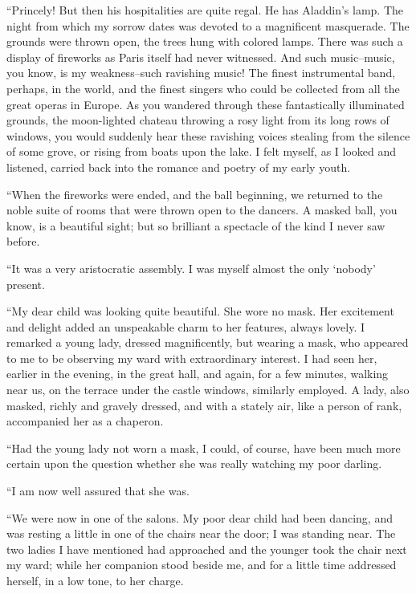\documentclass[11pt,twoside,makeidx,hidelinks,]{memoir}
\begin{document}
``Princely! But then his hospitalities are quite regal. He has Aladdin's
lamp. The night from which my sorrow dates was devoted to a magnificent
masquerade. The grounds were thrown open, the trees hung with colored
lamps. There was such a display of fireworks as Paris itself had never
witnessed. And such music--music, you know, is my weakness--such
ravishing music! The finest instrumental band, perhaps, in the world,
and the finest singers who could be collected from all the great operas
in Europe. As you wandered through these fantastically illuminated
grounds, the moon-lighted chateau throwing a rosy light from its long
rows of windows, you would suddenly hear these ravishing voices stealing
from the silence of some grove, or rising from boats upon the lake. I
felt myself, as I looked and listened, carried back into the romance and
poetry of my early youth.

``When the fireworks were ended, and the ball beginning, we returned to
the noble suite of rooms that were thrown open to the dancers. A masked
ball, you know, is a beautiful sight; but so brilliant a spectacle of
the kind I never saw before.

``It was a very aristocratic assembly. I was myself almost the only
`nobody' present.

``My dear child was looking quite beautiful. She wore no mask. Her
excitement and delight added an unspeakable charm to her features,
always lovely. I remarked a young lady, dressed magnificently, but
wearing a mask, who appeared to me to be observing my ward with
extraordinary interest. I had seen her, earlier in the evening, in the
great hall, and again, for a few minutes, walking near us, on the
terrace under the castle windows, similarly employed. A lady, also
masked, richly and gravely dressed, and with a stately air, like a
person of rank, accompanied her as a chaperon.

``Had the young lady not worn a mask, I could, of course, have been much
more certain upon the question whether she was really watching my
poor darling.

``I am now well assured that she was.

``We were now in one of the salons. My poor dear child had been dancing,
and was resting a little in one of the chairs near the door; I was
standing near. The two ladies I have mentioned had approached and the
younger took the chair next my ward; while her companion stood beside
me, and for a little time addressed herself, in a low tone, to
her charge.
\end{document}
